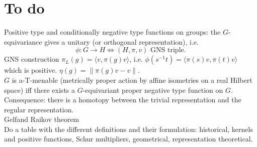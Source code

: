 \section{To do}
Positive type and conditionally negative type functions on groups: the $G$-equivariance gives a unitary (or orthogonal representation), i.e.
\[\phi: G\rightarrow H \iff (H,\pi,v) \text{ GNS triple}.\] 
GNS construction $\pi_L(g) = \langle v,\pi(g)v\rangle$, i.e. $\phi(s^{-1}t) = \langle \pi(s)v,\pi(t)v\rangle$ which is positive. $\eta(g)= \|\pi(g)v -v\|$. \\

$G$ is a-T-menable (metrically proper action by affine isometries on a real Hilbert space) iff there exists a $G$-equivariant proper negative type function on $G$.\\

Consequence: there is a homotopy between the trivial representation and the regular representation.\\

Gelfand Raikov theorem\\

Do a table with the different definitions and their formulation: historical, kernels and positive functions, Schur multipliers, geometrical, representation theoretical.

\newpage
